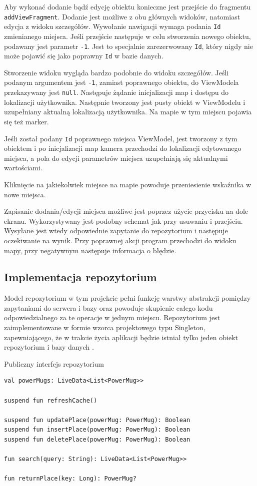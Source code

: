 \documentclass[polish,polish,a4paper,12pt]{article}
\begin{document}
	Aby wykonać dodanie bądź edycję obiektu konieczne jest przejście do fragmentu \texttt{addViewFragment}. Dodanie jest możliwe z obu głównych widoków, natomiast edycja z widoku szczegółów. Wywołanie nawigacji wymaga podania \texttt{Id} zmienianego miejsca. Jeśli przejście następuje w celu stworzenia nowego obiektu, podawany jest parametr \texttt{-1}. Jest to specjalnie zarezerwowany \texttt{Id}, który nigdy nie może pojawić się jako poprawny \texttt{Id} w bazie danych.

	Stworzenie widoku wygląda bardzo podobnie do widoku szczegółów. Jeśli podanym argumentem jest \texttt{-1}, zamiast poprawnego obiektu, do ViewModela przekazywany jest \texttt{null}. Następuje żądanie inicjalizacji map i dostępu do lokalizacji użytkownika. Następnie tworzony jest pusty obiekt w ViewModelu i uzupełniany aktualną lokalizacją użytkownika. Na mapie w tym miejscu pojawia się też marker.

	Jeśli został podany \texttt{Id} poprawnego miejsca ViewModel, jest tworzony z tym obiektem i po inicjalizacji map kamera przechodzi do lokalizacji edytowanego miejsca, a pola do edycji parametrów miejsca uzupełniają się aktualnymi wartościami.

	Kliknięcie na jakiekolwiek miejsce na mapie powoduje przeniesienie wskaźnika w nowe miejsca.

	Zapisanie dodania/edycji miejsca możliwe jest poprzez użycie przycisku na dole ekranu. Wykorzystywany jest podobny schemat jak przy usuwaniu i przejściu. Wysyłane jest wtedy odpowiednie zapytanie do repozytorium i następuje oczekiwanie na wynik. Przy poprawnej akcji program przechodzi do widoku mapy, przy negatywnym następuje informacja o błędzie.

	\subsection{Implementacja repozytorium}

	Model repozytorium w tym projekcie pełni funkcję warstwy abstrakcji pomiędzy zapytaniami do serwera i bazy oraz powoduje skupienie całego kodu odpowiedzialnego za te operacje w jednym miejscu. Repozytorium jest zaimplementowane w formie wzorca projektowego typu Singleton, zapewniającego, że w trakcie życia aplikacji będzie istniał tylko jeden obiekt repozytorium i bazy danych \cite{singletonwiki}.

	\begin{listing}[H]
		\caption{Publiczny interfejs repozytorium}
		\begin{verbatim}
val powerMugs: LiveData<List<PowerMug>>

suspend fun refreshCache()

suspend fun updatePlace(powerMug: PowerMug): Boolean
suspend fun insertPlace(powerMug: PowerMug): Boolean
suspend fun deletePlace(powerMug: PowerMug): Boolean

fun search(query: String): LiveData<List<PowerMug>>

fun returnPlace(key: Long): PowerMug?
		\end{verbatim}
		\label{listing:repository}
	\end{listing}
\end{document}
